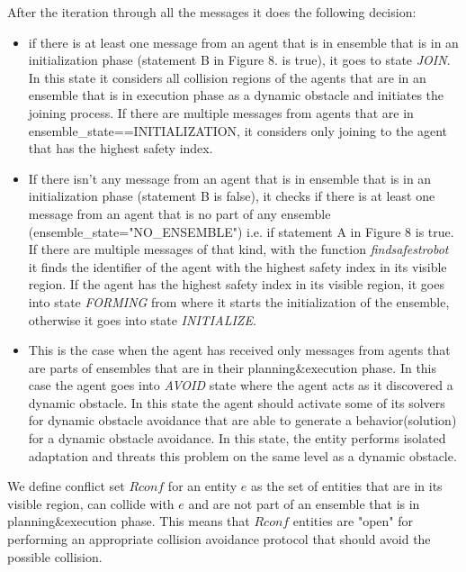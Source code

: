 \documentclass[journal]{IEEEtran}
\theoremstyle{definition}
\begin{document}
After the iteration through all the messages it does the following decision:
\begin{itemize}
\item if there is at least one message from an agent that is in ensemble that is in an initialization phase (statement B in Figure 8. is true), it goes to state \textit{JOIN}. In this state it considers all collision regions of the agents that are in an ensemble that is in execution phase as a dynamic obstacle and initiates the joining process. If there are multiple messages from agents that are in ensemble\_state==INITIALIZATION, it considers only joining to the agent 
that has the highest safety index.  
\item If there isn't any message from an agent that is in ensemble that is in an initialization phase (statement B is false), it checks if there is at least one message from an agent that is no part of any ensemble (ensemble\_state="NO\_ENSEMBLE") i.e. if statement A in Figure 8 is true. If there are multiple messages of that kind, with the function \textit{findsafestrobot} it finds the identifier of the agent with the highest safety index in its visible region. If the agent has the highest safety index in its visible region, it goes into state \textit{FORMING} from where it starts the initialization of the ensemble, otherwise it goes into state \textit{INITIALIZE}.
\item This is the case when the agent has received only messages from agents that are parts of ensembles that are in their planning\&execution phase. In this case the agent goes into \textit{AVOID} state where the agent acts as it discovered a dynamic obstacle. In this state the agent should activate some of its solvers for dynamic obstacle avoidance that are able to generate a behavior(solution) for a dynamic obstacle avoidance. In this state, the entity performs isolated adaptation and threats this problem on the same level as a dynamic obstacle.
\end{itemize}

We define conflict set $Rconf$ for an entity $e$ as the set of entities that are in its visible region, can collide with $e$ and are not part of an ensemble that is in planning\&execution phase. This means that $Rconf$ entities are "open" for performing an appropriate collision avoidance protocol that should avoid the possible collision.
\end{document}

